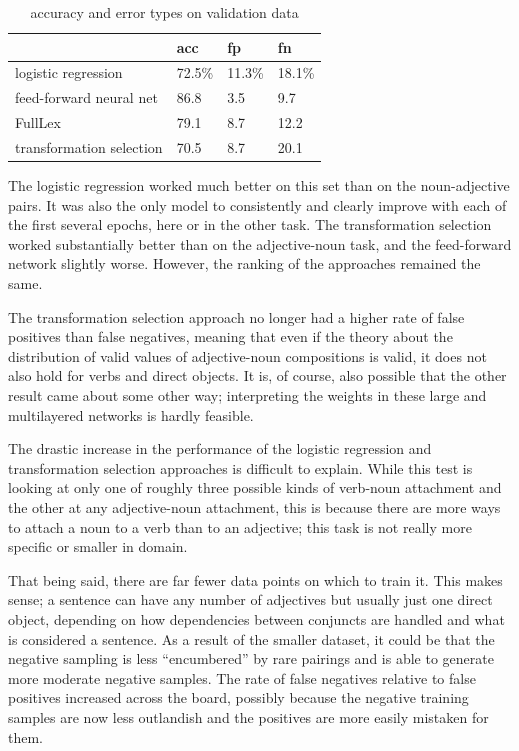 \documentclass[a4paper, 12pt]{article}
\begin{document}
\begin{table}[]
	\centering
	\begin{tabular}{l|lll}
		                         & acc      & fp       & fn        \\ \hline
		logistic regression      & 72.5\%   & 11.3\%   & 18.1\%    \\
		feed-forward neural net  & 86.8     & 3.5      & 9.7       \\
		FullLex                  & 79.1     & 8.7      & 12.2      \\
		transformation selection & 70.5     & 8.7      & 20.1
	\end{tabular}
	\caption{accuracy and error types on validation data}
	\label{accuracy-vn}
\end{table}

The logistic regression worked much better on this set than on the noun-adjective pairs. It was also the only model to consistently and clearly improve with each of the first several epochs, here or in the other task. The transformation selection worked substantially better than on the adjective-noun task, and the feed-forward network slightly worse. However, the ranking of the approaches remained the same.

The transformation selection approach no longer had a higher rate of false positives than false negatives, meaning that even if the theory about the distribution of valid values of adjective-noun compositions is valid, it does not also hold for verbs and direct objects. It is, of course, also possible that the other result came about some other way; interpreting the weights in these large and multilayered networks is hardly feasible.

The drastic increase in the performance of the logistic regression and transformation selection approaches is difficult to explain. While this test is looking at only one of roughly three possible kinds of verb-noun attachment and the other at any adjective-noun attachment, this is because there are more ways to attach a noun to a verb than to an adjective; this task is not really more specific or smaller in domain.

That being said, there are far fewer data points on which to train it. This makes sense; a sentence can have any number of adjectives but usually just one direct object, depending on how dependencies between conjuncts are handled and what is considered a sentence. As a result of the smaller dataset, it could be that the negative sampling is less ``encumbered'' by rare pairings and is able to generate more moderate negative samples. The rate of false negatives relative to false positives increased across the board, possibly because the negative training samples are now less outlandish and the positives are more easily mistaken for them.
\end{document}

